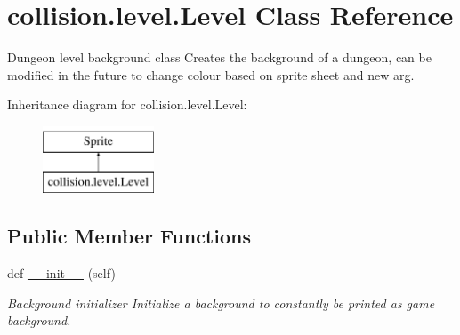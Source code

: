 \hypertarget{classcollision_1_1level_1_1_level}{}\section{collision.\+level.\+Level Class Reference}
\label{classcollision_1_1level_1_1_level}


Dungeon level background class  Creates the background of a dungeon, can be modified in the future to change colour based on sprite sheet and new arg.  


Inheritance diagram for collision.\+level.\+Level\+:\begin{figure}[H]
\begin{center}
\leavevmode
\includegraphics[height=2.000000cm]{classcollision_1_1level_1_1_level}
\end{center}
\end{figure}
\subsection*{Public Member Functions}
\begin{DoxyCompactItemize}
\item 
\mbox{\label{classcollision_1_1level_1_1_level_a241b5e528c34fdcfe53f70c0041bea2a}} 
def \hyperlink{classcollision_1_1level_1_1_level_a241b5e528c34fdcfe53f70c0041bea2a}{\+\_\+\+\_\+init\+\_\+\+\_\+} (self)
\begin{DoxyCompactList}\small\item\em Background initializer  Initialize a background to constantly be printed as game background. \end{DoxyCompactList}\end{DoxyCompactItemize}
